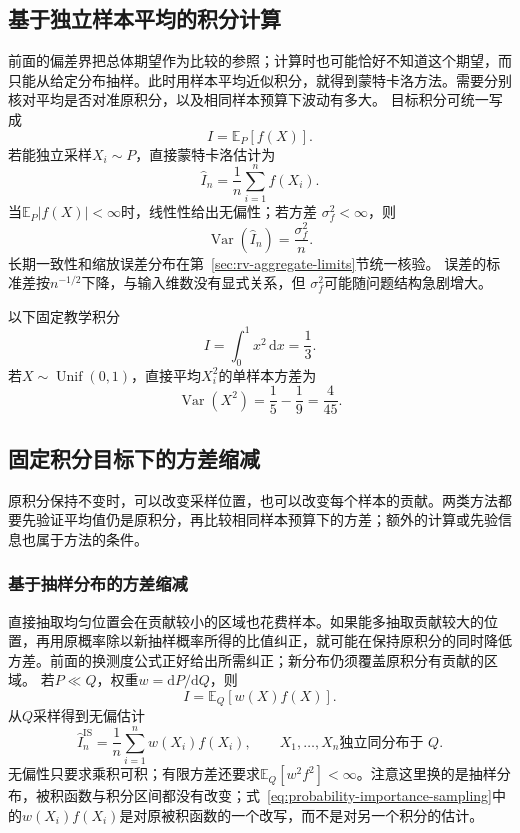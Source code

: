 \subsection{基于独立样本平均的积分计算}
\label{sec:probability-monte-carlo-variance-reduction}
前面的偏差界把总体期望作为比较的参照；计算时也可能恰好不知道这个期望，而只能从给定分布抽样。此时用样本平均近似积分，就得到蒙特卡洛方法。需要分别核对平均是否对准原积分，以及相同样本预算下波动有多大。
目标积分可统一写成
\[ I=\mathbb{E}_P[f(X)]. \]
若能独立采样\(X_i\sim P\)，直接蒙特卡洛估计为
\[ \widehat{I}_n
  =\frac{1}{n}\sum_{i=1}^{n}f(X_i). \]
当\(\mathbb E_P|f(X)|<\infty\)时，线性性给出无偏性；若方差
\(\sigma_f^2<\infty\)，则
\[ \operatorname{Var}(\widehat I_n)=\frac{\sigma_f^2}{n}. \]
长期一致性和缩放误差分布在第~\ref{sec:rv-aggregate-limits}节统一核验。
误差的标准差按\(n^{-1/2}\)下降，与输入维数没有显式关系，但
\(\sigma_f^2\)可能随问题结构急剧增大。

以下固定教学积分
\[ I=\int_0^1x^2\,\mathrm{d}x=\frac13. \]
若\(X\sim\operatorname{Unif}(0,1)\)，直接平均\(X_i^2\)的单样本方差为
\[ \operatorname{Var}(X^2)
  =\frac15-\frac19=\frac{4}{45}. \]

\subsection{固定积分目标下的方差缩减}
原积分保持不变时，可以改变采样位置，也可以改变每个样本的贡献。两类方法都要先验证平均值仍是原积分，再比较相同样本预算下的方差；额外的计算或先验信息也属于方法的条件。

\subsubsection{基于抽样分布的方差缩减}
直接抽取均匀位置会在贡献较小的区域也花费样本。如果能多抽取贡献较大的位置，再用原概率除以新抽样概率所得的比值纠正，就可能在保持原积分的同时降低方差。前面的换测度公式正好给出所需纠正；新分布仍须覆盖原积分有贡献的区域。
若\(P\ll Q\)，权重\(w=\mathrm{d}P/\mathrm{d}Q\)，则
\[ I=\mathbb{E}_Q[w(X)f(X)]. \]
从\(Q\)采样得到无偏估计
\begin{equation}
  \widehat{I}^{\mathrm{IS}}_n
  =
  \frac{1}{n}\sum_{i=1}^{n}w(X_i)f(X_i),
  \qquad X_1,\ldots,X_n\text{独立同分布于 }Q.
  \label{eq:probability-importance-sampling}
\end{equation}
无偏性只要求乘积可积；有限方差还要求\(\mathbb{E}_Q[w^2f^2]<\infty\)。注意这里换的是抽样分布，被积函数与积分区间都没有改变；式~\eqref{eq:probability-importance-sampling}中的\(w(X_i)f(X_i)\)是对原被积函数的一个改写，而不是对另一个积分的估计。

